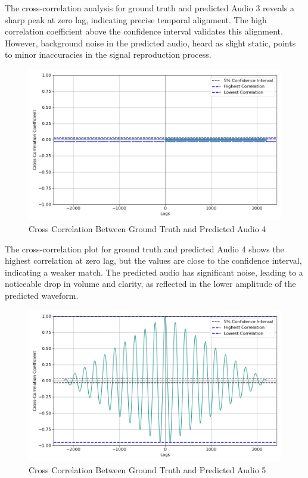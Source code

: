 \documentclass{ioereport}
\begin{document}
    The cross-correlation analysis for ground truth and predicted Audio 3 reveals a sharp peak at zero lag, indicating precise temporal alignment. The high correlation coefficient above the confidence interval validates this alignment. However, background noise in the predicted audio, heard as slight static, points to minor inaccuracies in the signal reproduction process.

    \begin{figure}[H]
        \centering
        \includegraphics[width=\linewidth]{assets/crosscorrelation/cross_correlation_puretone5000hz.wav_puretone5000hzpred.wav.png}
        \caption{Cross Correlation Between Ground Truth and Predicted Audio 4}
        \label{fig:cross-correlation-4}
    \end{figure}

    The cross-correlation plot for ground truth and predicted Audio 4 shows the highest correlation at zero lag, but the values are close to the confidence interval, indicating a weaker match. The predicted audio has significant noise, leading to a noticeable drop in volume and clarity, as reflected in the lower amplitude of the predicted waveform.

    \begin{figure}[H]
        \centering
        \includegraphics[width=\linewidth]{assets/crosscorrelation/cross_correlation_sweeping_tone200-500hz.wav_sweeping_tone200-500hzpred.wav.png}
        \caption{Cross Correlation Between Ground Truth and Predicted Audio 5}
        \label{fig:cross-correlation-5}
    \end{figure}
    
\end{document}
